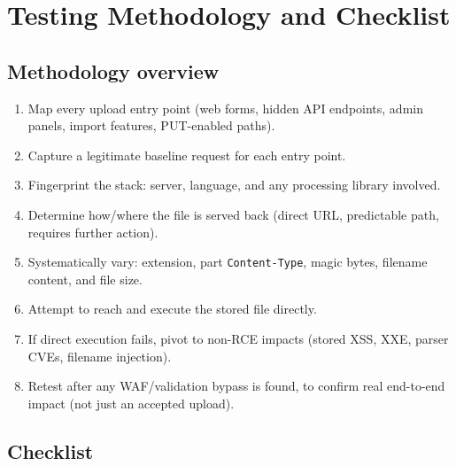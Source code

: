 \documentclass[11pt]{article}
\begin{document}
\section{Testing Methodology and Checklist}

\subsection{Methodology overview}
\begin{enumerate}[leftmargin=1.4em]
    \item Map every upload entry point (web forms, hidden API endpoints, admin panels, import features, PUT-enabled paths).
    \item Capture a legitimate baseline request for each entry point.
    \item Fingerprint the stack: server, language, and any processing library involved.
    \item Determine how/where the file is served back (direct URL, predictable path, requires further action).
    \item Systematically vary: extension, part \texttt{Content-Type}, magic bytes, filename content, and file size.
    \item Attempt to reach and execute the stored file directly.
    \item If direct execution fails, pivot to non-RCE impacts (stored XSS, XXE, parser CVEs, filename injection).
    \item Retest after any WAF/validation bypass is found, to confirm real end-to-end impact (not just an accepted upload).
\end{enumerate}

\subsection{Checklist}
\end{document}
